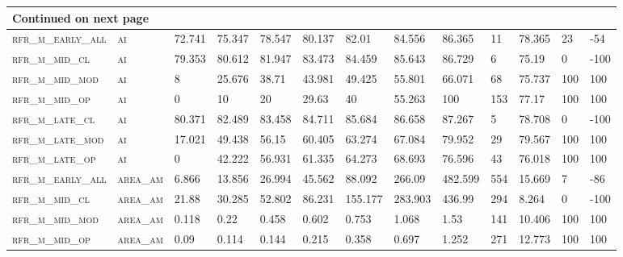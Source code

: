 \begin{landscape}
\begin{center}
\begin{footnotesize}
\begin{longtable}{lllllllllllll}
\hline \multicolumn{13}{|l|}{{Continued on next page}} \\ \hline
\endfoot

\hline \hline
\endlastfoot

\textsc{rfr\_m\_early\_all} & \textsc{ai        }   & 72.741  & 75.347  & 78.547   & 80.137   & 82.01    & 84.556   & 86.365   & 11     & 78.365        & 23            & -54      \\
\textsc{rfr\_m\_mid\_cl   } & \textsc{ai        }   & 79.353  & 80.612  & 81.947   & 83.473   & 84.459   & 85.643   & 86.729   & 6      & 75.19         & 0             & -100     \\
\textsc{rfr\_m\_mid\_mod  } & \textsc{ai        }   & 8       & 25.676  & 38.71    & 43.981   & 49.425   & 55.801   & 66.071   & 68     & 75.737        & 100           & 100      \\
\textsc{rfr\_m\_mid\_op   } & \textsc{ai        }   & 0       & 10      & 20       & 29.63    & 40       & 55.263   & 100      & 153    & 77.17         & 100           & 100      \\
\textsc{rfr\_m\_late\_cl  } & \textsc{ai        }   & 80.371  & 82.489  & 83.458   & 84.711   & 85.684   & 86.658   & 87.267   & 5      & 78.708        & 0             & -100     \\
\textsc{rfr\_m\_late\_mod } & \textsc{ai        }   & 17.021  & 49.438  & 56.15    & 60.405   & 63.274   & 67.084   & 79.952   & 29     & 79.567        & 100           & 100      \\
\textsc{rfr\_m\_late\_op  } & \textsc{ai        }   & 0       & 42.222  & 56.931   & 61.335   & 64.273   & 68.693   & 76.596   & 43     & 76.018        & 100           & 100      \\
\textsc{rfr\_m\_early\_all} & \textsc{area\_am  }   & 6.866   & 13.856  & 26.994   & 45.562   & 88.092   & 266.09   & 482.599  & 554    & 15.669        & 7             & -86      \\
\textsc{rfr\_m\_mid\_cl   } & \textsc{area\_am  }   & 21.88   & 30.285  & 52.802   & 86.231   & 155.177  & 283.903  & 436.99   & 294    & 8.264         & 0             & -100     \\
\textsc{rfr\_m\_mid\_mod  } & \textsc{area\_am  }   & 0.118   & 0.22    & 0.458    & 0.602    & 0.753    & 1.068    & 1.53     & 141    & 10.406        & 100           & 100      \\
\textsc{rfr\_m\_mid\_op   } & \textsc{area\_am  }   & 0.09    & 0.114   & 0.144    & 0.215    & 0.358    & 0.697    & 1.252    & 271    & 12.773        & 100           & 100      \\

\end{longtable}
\end{footnotesize}
\end{center}
\end{landscape}
